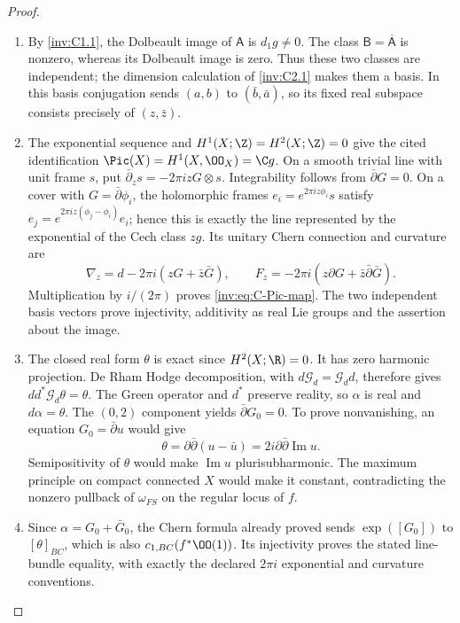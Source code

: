\begin{proof}
\begin{enumerate}[label=\arabic*.,leftmargin=*]
\item By \ref{inv:C1.1}, the Dolbeault image of $\mathsf A$ is
$d_1g\ne0$. The class $\mathsf B=\overline{\mathsf A}$ is nonzero,
whereas its Dolbeault image is zero. Thus these two classes are
independent; the dimension calculation of \ref{inv:C2.1} makes
them a basis. In this basis conjugation sends $(a,b)$ to
$(\bar b,\bar a)$, so its fixed real subspace consists precisely
of $(z,\bar z)$.

\item The exponential sequence and $H^1(X;\Z)=H^2(X;\Z)=0$ give the
cited identification $\Pic(X)=H^1(X,\OO_X)=\C g$.
On a smooth trivial line with unit frame $s$, put
$\bar\partial_zs=-2\pi izG\otimes s$. Integrability follows from
$\bar\partial G=0$. On a cover with $G=\bar\partial\phi_i$,
the holomorphic frames $e_i=e^{2\pi iz\phi_i}s$ satisfy
$e_j=e^{2\pi iz(\phi_j-\phi_i)}e_i$; hence this is exactly the
line represented by the exponential of the Cech class $zg$.
Its unitary Chern connection and curvature are
\[
 \nabla_z=d-2\pi i(zG+\bar z\bar G),\qquad
 F_z=-2\pi i(z\partial G+\bar z\bar\partial\bar G).
\]
Multiplication by $i/(2\pi)$ proves \eqref{inv:eq:C-Pic-map}.
The two independent basis vectors prove injectivity, additivity
as real Lie groups and the assertion about the image.

\item The closed real form $\theta$ is exact since $H^2(X;\R)=0$.
It has zero harmonic projection. De Rham Hodge decomposition,
with $d\mathcal G_d=\mathcal G_dd$, therefore gives
$dd^*\mathcal G_d\theta=\theta$. The Green operator and $d^*$
preserve reality, so $\alpha$ is real and $d\alpha=\theta$.
The $(0,2)$ component yields $\bar\partial G_0=0$.
To prove nonvanishing, an equation $G_0=\bar\partial u$ would give
\[
 \theta=\partial\bar\partial(u-\bar u)
       =2i\partial\bar\partial\operatorname{Im}u.
\]
Semipositivity of $\theta$ would make $\operatorname{Im}u$
plurisubharmonic. The maximum principle on compact connected $X$
would make it constant, contradicting the nonzero pullback of
$\omega_{FS}$ on the regular locus of $f$.

\item Since $\alpha=G_0+\bar G_0$, the Chern formula already proved
sends $\exp([G_0])$ to $[\theta]_{BC}$, which is also
$c_{1,BC}(f^*\OO(1))$. Its injectivity proves the stated
line-bundle equality, with exactly the declared $2\pi i$
exponential and curvature conventions.


\end{enumerate}
\end{proof}
